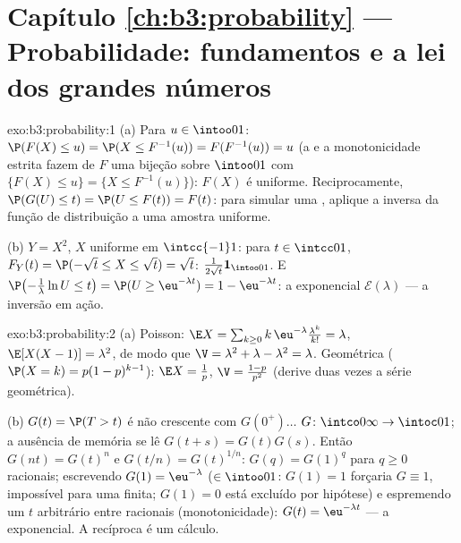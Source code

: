 \section*{Capítulo \ref{ch:b3:probability} --- Probabilidade:
fundamentos e a lei dos grandes números}

\begin{solution}{exo:b3:probability:1}
(a) Para $u \in \intoo01$: $\P(F(X) \leq u) = \P(X \leq
F^{-1}(u)) = F(F^{-1}(u)) = u$ (a  e a monotonicidade
estrita fazem de $F$ uma bijeção sobre $\intoo01$ com
$\{F(X) \leq u\} = \{X \leq F^{-1}(u)\}$): $F(X)$ é uniforme.
Reciprocamente, $\P(G(U) \leq t) = \P(U \leq F(t)) = F(t)$: para
simular uma , aplique a inversa da função de distribuição a uma
amostra uniforme.

(b) $Y = X^2$, $X$ uniforme em $\intcc{-1}1$: para $t \in
\intcc01$, $F_Y(t) = \P(-\sqrt t \leq X \leq \sqrt t) = \sqrt
t$:  $\frac1{2\sqrt t}\mathbf 1_{\intoo01}$. E
$\P\bigl(-\frac1\lambda\ln U \leq t\bigr) = \P(U \geq
\eu^{-\lambda t}) = 1 - \eu^{-\lambda t}$: a exponencial
$\mathcal E(\lambda)$ --- a inversão em ação.
\end{solution}

\begin{solution}{exo:b3:probability:2}
(a) Poisson: $\E X = \sum_{k\geq0}k\,\eu^{-\lambda}
\frac{\lambda^k}{k!} = \lambda$, $\E[X(X-1)] = \lambda^2$, de modo que
$\V = \lambda^2 + \lambda - \lambda^2 = \lambda$. Geométrica
($\P(X = k) = p(1-p)^{k-1}$): $\E X = \frac1p$, $\V =
\frac{1-p}{p^2}$ (derive duas vezes a série geométrica).

(b) $G(t) = \P(T > t)$ é não crescente com $G(0^+)\dots$
$G \colon \intco0\infty \to \intoc01$; a ausência de memória se lê
$G(t + s) = G(t)G(s)$. Então $G(n t) = G(t)^n$ e $G(t/n) =
G(t)^{1/n}$: $G(q) = G(1)^q$ para $q \geq 0$ racionais; escrevendo
$G(1) = \eu^{-\lambda}$ ($\in \intoo01$: $G(1) = 1$ forçaria
$G \equiv 1$, impossível para uma  finita;
$G(1) = 0$ está excluído por hipótese) e espremendo um
$t$ arbitrário entre racionais (monotonicidade): $G(t) =
\eu^{-\lambda t}$ --- a  exponencial. A recíproca é um
cálculo.
\end{solution}

